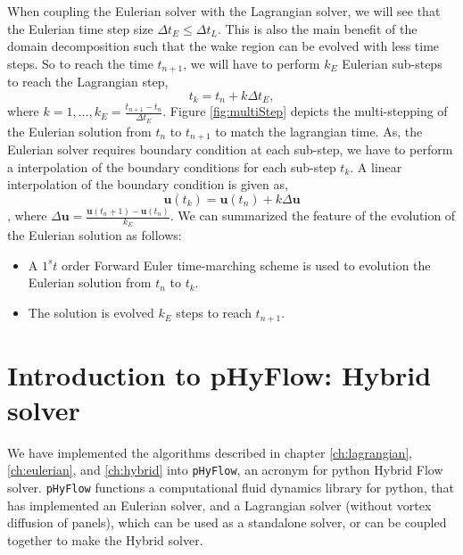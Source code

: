 When coupling the Eulerian solver with the Lagrangian solver, we will see that the Eulerian time step size $\Delta t_E \leqslant \Delta t_L$. This is also the main benefit of the domain decomposition such that the wake region can be evolved with less time steps. So to reach the time $t_{n+1}$, we will have to perform $k_E$ Eulerian sub-steps to reach the Lagrangian step, 
\begin{equation}
t_{k} = t_n + k\Delta t_E,
\end{equation}
where $k = 1,...,k_E=\frac{t_{n+1}-t_{n}}{\Delta t_E}$. Figure \ref{fig:multiStep} depicts the multi-stepping of the Eulerian solution from $t_n$ to $t_{n+1}$ to match the lagrangian time. As, the Eulerian solver requires boundary condition at each sub-step, we have to perform a interpolation of the boundary conditions for each sub-step $t_k$. A linear interpolation of the boundary condition is given as,
\begin{equation}
\mathbf{u}(t_k) = \mathbf{u}(t_n) + k \Delta \mathbf{u}
\end{equation},
where $\Delta \mathbf{u} = \frac{\mathbf{u}(t_n+1)-\mathbf{u}(t_n)}{k_E}$. We can summarized the feature of the evolution of the Eulerian solution as follows:
\begin{itemize}
\item A $1^st$ order Forward Euler time-marching scheme is used to evolution the Eulerian solution from $t_n$ to $t_k$.
\item The solution is evolved $k_E$ steps to reach $t_{n+1}$.
\end{itemize}

\section{Introduction to pHyFlow: Hybrid solver}

We have implemented the algorithms described in chapter \ref{ch:lagrangian}, \ref{ch:eulerian}, and \ref{ch:hybrid} into \texttt{pHyFlow}, an acronym for  python Hybrid Flow solver. \texttt{pHyFlow} functions a computational fluid dynamics library for python, that has implemented an Eulerian solver, and a Lagrangian solver (without vortex diffusion of panels), which can be used as a standalone solver, or can be coupled together to make the Hybrid solver. 

